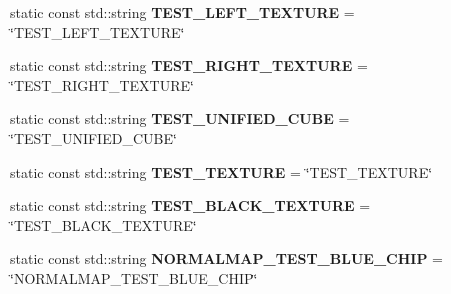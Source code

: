 \begin{DoxyCompactItemize}
\item 
\mbox{\label{struct_geometry_engine_1_1_geometry_material_1_1_texture_constant_a14d17c2dd6125effc0109ac404df9741}} 
static const std\+::string {\bfseries T\+E\+S\+T\+\_\+\+L\+E\+F\+T\+\_\+\+T\+E\+X\+T\+U\+RE} = \char`\"{}T\+E\+S\+T\+\_\+\+L\+E\+F\+T\+\_\+\+T\+E\+X\+T\+U\+RE\char`\"{}
\item 
\mbox{\label{struct_geometry_engine_1_1_geometry_material_1_1_texture_constant_ac18fed20edf867ce13ccd3cb3cde43cd}} 
static const std\+::string {\bfseries T\+E\+S\+T\+\_\+\+R\+I\+G\+H\+T\+\_\+\+T\+E\+X\+T\+U\+RE} = \char`\"{}T\+E\+S\+T\+\_\+\+R\+I\+G\+H\+T\+\_\+\+T\+E\+X\+T\+U\+RE\char`\"{}
\item 
\mbox{\label{struct_geometry_engine_1_1_geometry_material_1_1_texture_constant_a133496f744e5c15fb2b2bed24b348f2d}} 
static const std\+::string {\bfseries T\+E\+S\+T\+\_\+\+U\+N\+I\+F\+I\+E\+D\+\_\+\+C\+U\+BE} = \char`\"{}T\+E\+S\+T\+\_\+\+U\+N\+I\+F\+I\+E\+D\+\_\+\+C\+U\+BE\char`\"{}
\item 
\mbox{\label{struct_geometry_engine_1_1_geometry_material_1_1_texture_constant_ac96667257b17fce30cf2a27785483bd7}} 
static const std\+::string {\bfseries T\+E\+S\+T\+\_\+\+T\+E\+X\+T\+U\+RE} = \char`\"{}T\+E\+S\+T\+\_\+\+T\+E\+X\+T\+U\+RE\char`\"{}
\item 
\mbox{\label{struct_geometry_engine_1_1_geometry_material_1_1_texture_constant_ac0676c7dcdd7639f65e6bd1cb2b67772}} 
static const std\+::string {\bfseries T\+E\+S\+T\+\_\+\+B\+L\+A\+C\+K\+\_\+\+T\+E\+X\+T\+U\+RE} = \char`\"{}T\+E\+S\+T\+\_\+\+B\+L\+A\+C\+K\+\_\+\+T\+E\+X\+T\+U\+RE\char`\"{}
\item 
\mbox{\label{struct_geometry_engine_1_1_geometry_material_1_1_texture_constant_a31aa79e8443d0d82bc58e302069248a6}} 
static const std\+::string {\bfseries N\+O\+R\+M\+A\+L\+M\+A\+P\+\_\+\+T\+E\+S\+T\+\_\+\+B\+L\+U\+E\+\_\+\+C\+H\+IP} = \char`\"{}N\+O\+R\+M\+A\+L\+M\+A\+P\+\_\+\+T\+E\+S\+T\+\_\+\+B\+L\+U\+E\+\_\+\+C\+H\+IP\char`\"{}
\end{DoxyCompactItemize}


